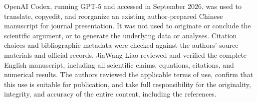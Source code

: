 OpenAI Codex, running GPT-5 and accessed in September 2026, was used to translate, copyedit, and reorganize an existing author-prepared Chinese manuscript for journal presentation. It was not used to originate or conclude the scientific argument, or to generate the underlying data or analyses. Citation choices and bibliographic metadata were checked against the authors' source materials and official records. JiaWang Liao reviewed and verified the complete English manuscript, including all scientific claims, equations, citations, and numerical results. The authors reviewed the applicable terms of use, confirm that this use is suitable for publication, and take full responsibility for the originality, integrity, and accuracy of the entire content, including the references.

